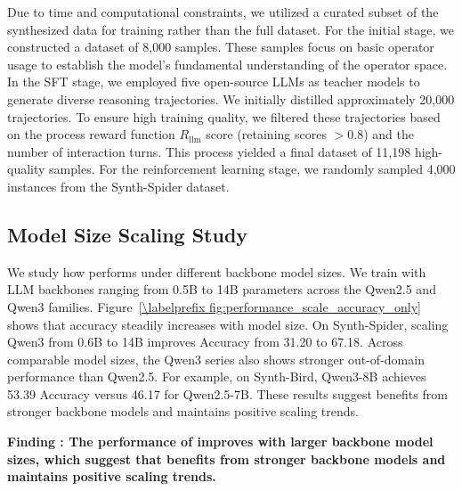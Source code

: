 Due to time and computational constraints, we utilized a curated subset of the synthesized data for training rather than the full dataset. For the initial stage, we constructed a dataset of 8,000 samples. These samples focus on basic operator usage to establish the model's fundamental understanding of the operator space. In the SFT stage, we employed five open-source LLMs as teacher models to generate diverse reasoning trajectories. We initially distilled approximately 20,000 trajectories. To ensure high training quality, we filtered these trajectories based on the process reward function $R_{\text{llm}}$ score (retaining scores $> 0.8$) and the number of interaction turns. This process yielded a final dataset of 11,198 high-quality samples. For the reinforcement learning stage, we randomly sampled 4,000 instances from the Synth-Spider dataset.

\subsection{Model Size Scaling Study}
\label{subsec:appendix_model_size_scale}



We study how \sys performs under different backbone model sizes. We train \sys with LLM backbones ranging from 0.5B to 14B parameters across the Qwen2.5 and Qwen3 families.
Figure~\ref{\labelprefix fig:performance_scale_accuracy_only} shows that accuracy steadily increases with model size. On Synth-Spider, scaling Qwen3 from 0.6B to 14B improves Accuracy from 31.20 to 67.18. Across comparable model sizes, the Qwen3 series also shows stronger out-of-domain performance than Qwen2.5. For example, on Synth-Bird, Qwen3-8B achieves 53.39 Accuracy versus 46.17 for Qwen2.5-7B. These results suggest \sys benefits from stronger backbone models and maintains positive scaling trends.

\begin{shaded}
\noindent
\textbf{Finding \findingnum: The performance of \sys improves with larger backbone model sizes, which suggest that \sys benefits from stronger backbone models and maintains positive scaling trends.}
\end{shaded}
